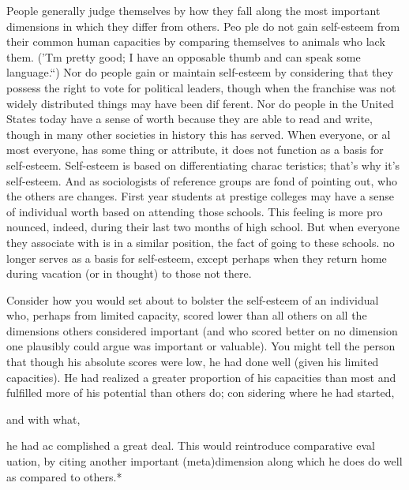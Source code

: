 \documentclass[11pt,openany]{book}
\begin{document}
People generally judge themselves by how they fall along the most important dimensions in which they differ from others. Peo ple do not gain self-esteem from their common human capacities by comparing themselves to animals who lack them. ('Tm pretty good; I have an opposable thumb and can speak some language.``) Nor do people gain or maintain self-esteem by considering that they possess the right to vote for political leaders, though when the franchise was not widely distributed things may have been dif ferent. Nor do people in the United States today have a sense of worth because they are able to read and write, though in many other societies in history this has served. When everyone, or al most everyone, has some thing or attribute, it does not function as a basis for self-esteem. Self-esteem is based on differentiating charac teristics; that's why it's self-esteem. And as sociologists of reference groups are fond of pointing out, who the others are changes. First year students at prestige colleges may have a sense of individual worth based on attending those schools. This feeling is more pro nounced, indeed, during their last two months of high school. But when everyone they associate with is in a similar position, the fact of going to these schools. no longer serves as a basis for self-esteem, except perhaps when they return home during vacation (or in thought) to those not there. 

Consider how you would set about to bolster the self-esteem of an individual who, perhaps from limited capacity, scored lower than all others on all the dimensions others considered important (and who scored better on no dimension one plausibly could argue was important or valuable). You might tell the person that though his absolute scores were low, he had done well (given his limited capacities). He had realized a greater proportion of his capacities than most and fulfilled more of his potential than others do; con sidering where he had started, 

and with what, 

he had ac complished a great deal. This would reintroduce comparative eval uation, by citing another important (meta)dimension along which he does do well as compared to others.* 
\end{document}
